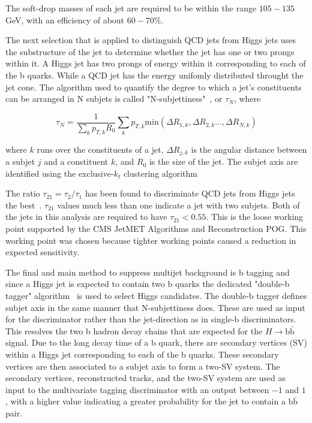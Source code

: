 The soft-drop masses of each jet are required to be within the range $105-135$ GeV, with an efficiency of about $60-70\%$. 

The next selection that is applied to distinguish QCD jets from Higgs jets uses the substructure of the jet to determine whether the jet has one or two prongs within it. A Higgs jet has two prongs of energy within it corresponding to each of the b quarks. While a QCD jet has the energy unifomly distributed throught the jet cone. The algorithm used to quantify the degree to which a jet's constituents can be arranged in N subjets is called "N-subjettiness"~\cite{Nsubjettiness}, or $\tau_{N}$, where

\begin{equation}
\tau_{N} = \frac{1}{\sum_{k}p_{T,k}R_{0}}\sum_{k}p_{T,k}\mathrm{min}(\Delta R_{1,k},\Delta R_{2,k}...,\Delta R_{N,k})
\end{equation}

\noindent
where $k$ runs over the constituents of a jet, $\Delta R_{j,k}$ is the angular distance between a subjet $j$ and a constituent $k$, and $R_{0}$ is the size of the jet. The subjet axis are identified using the exclusive-$k_{t}$ clustering algorithm~\cite{kTCluster, kTCluster2}

The ratio $\tau_{21}=\tau_{2}/\tau_{1}$ has been found to discriminate QCD jets from Higgs jets the best~\cite{Nsubjettiness2}. $\tau_{21}$ values much less than one indicate a jet with two subjets. Both of the jets in this analysis are required to have $\tau_{21} < 0.55$. This is the loose working point supported by the CMS JetMET Algorithms and Reconstruction POG. This working point was chosen because tighter working points caused a reduction in expected sensitivity.

The final and main method to suppress multijet background is b tagging and since a Higgs jet is expected to contain two b quarks the dedicated "double-b tagger" algorithm~\cite{DoubleB} is used to select Higgs candidates. The double-b tagger defines subjet axis in the same manner that N-subjettiness does. These are used as input for the discriminator rather than the jet-direction as in single-b discriminators. This resolves the two b hadron decay chains that are expected for the $H\rightarrow \mathrm{b\bar{b}}$ signal. Due to the long decay time of a b quark, there are secondary vertices (SV) within a Higgs jet corresponding to each of the b quarks. These secondary vertices are then associated to a subjet axis to form a two-SV system. The secondary vertices, reconstructed tracks, and the two-SV system are used as input to the multivariate tagging discriminator with an output between $-1$ and $1$, with a higher value indicating a greater probability for the jet to contain a $\mathrm{b\bar{b}}$ pair. 

